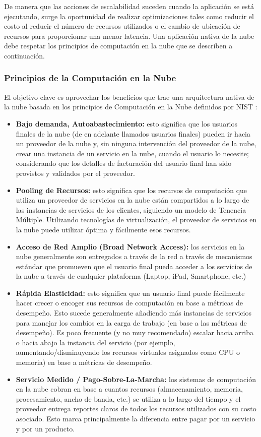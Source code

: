    De manera que las acciones de escalabilidad suceden cuando la aplicación se está ejecutando, surge la oportunidad de realizar optimizaciones tales como reducir el costo al reducir el número de recursos utilizados o el cambio de ubicación de recursos para proporcionar una menor latencia. Una aplicación nativa de la nube debe respetar los principios de computación en la nube que se describen a continuación.
	
        \subsubsection{Principios de la Computación en la Nube}
        El objetivo clave es aprovechar los beneficios que trae una arquitectura nativa de la nube basada en los principios de Computación en la Nube definidos por NIST \parencite{Mell2011-wz}:
        \begin{itemize}
            \item \textbf{Bajo demanda, Autoabastecimiento:} esto significa que los usuarios finales de la nube (de en adelante llamados usuarios finales) pueden ir hacia un proveedor de la nube y, sin ninguna intervención del proveedor de la nube, crear una instancia de un servicio en la nube,  cuando el usuario lo necesite; considerando que los detalles de facturación del usuario final han sido provistos y validados por el proveedor.
            \item \textbf{Pooling de Recursos:} esto significa que los recursos de computación que utiliza un proveedor de servicios en la nube están compartidos a lo largo de las instancias de servicios de los clientes, siguiendo un modelo de Tenencia Múltiple. Utilizando tecnologías de virtualización, el proveedor de servicios en la nube puede utilizar óptima y fácilmente esos recursos. 
            \item \textbf{Acceso de Red Amplio (Broad Network Access):} los servicios en la nube generalmente son entregados a través de la red a través de mecanismos estándar que promueven que el usuario final pueda acceder a los servicios de la nube a través de cualquier plataforma (Laptop, iPad, Smartphone, etc.)
            \item \textbf{Rápida Elasticidad:} esto significa que un usuario final puede fácilmente hacer crecer o encoger sus recursos de computación en base a métricas de desempeño. Esto sucede generalmente añadiendo más instancias de servicios para manejar los cambios en la carga de trabajo (en base a las métricas de desempeño). Es poco frecuente (y no muy recomendado) escalar hacia arriba o hacia abajo la instancia del servicio (por ejemplo, aumentando/disminuyendo los recursos virtuales asignados como CPU o memoria) en base a métricas de desempeño.
            \item \textbf{Servicio Medido / Pago-Sobre-La-Marcha:}  los sistemas de computación en la nube cobran en base a cuantos recursos (almacenamiento, memoria, procesamiento, ancho de banda, etc.) se utiliza a lo largo del tiempo y el proveedor entrega reportes claros de todos los recursos utilizados con su costo asociado. Esto marca principalmente la diferencia entre pagar por un servicio y por un producto.
        \end{itemize}
        
